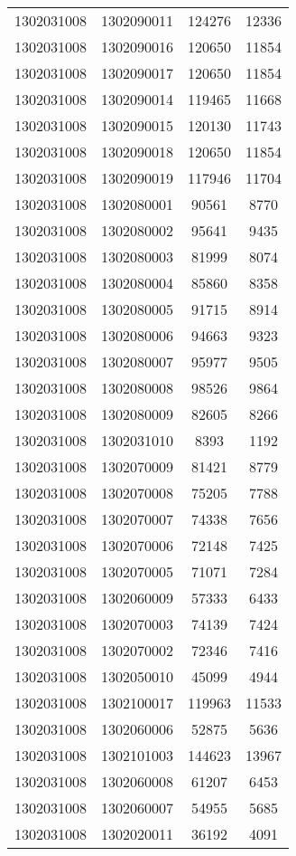 \begin{longtable}[h]{llcc}
		1302031008 & 1302090011 & 124276 & 12336\\
		1302031008 & 1302090016 & 120650 & 11854\\
		1302031008 & 1302090017 & 120650 & 11854\\
		1302031008 & 1302090014 & 119465 & 11668\\
		1302031008 & 1302090015 & 120130 & 11743\\
		1302031008 & 1302090018 & 120650 & 11854\\
		1302031008 & 1302090019 & 117946 & 11704\\
		1302031008 & 1302080001 & 90561 & 8770\\
		1302031008 & 1302080002 & 95641 & 9435\\
		1302031008 & 1302080003 & 81999 & 8074\\
		1302031008 & 1302080004 & 85860 & 8358\\
		1302031008 & 1302080005 & 91715 & 8914\\
		1302031008 & 1302080006 & 94663 & 9323\\
		1302031008 & 1302080007 & 95977 & 9505\\
		1302031008 & 1302080008 & 98526 & 9864\\
		1302031008 & 1302080009 & 82605 & 8266\\
		1302031008 & 1302031010 & 8393 & 1192\\
		1302031008 & 1302070009 & 81421 & 8779\\
		1302031008 & 1302070008 & 75205 & 7788\\
		1302031008 & 1302070007 & 74338 & 7656\\
		1302031008 & 1302070006 & 72148 & 7425\\
		1302031008 & 1302070005 & 71071 & 7284\\
		1302031008 & 1302060009 & 57333 & 6433\\
		1302031008 & 1302070003 & 74139 & 7424\\
		1302031008 & 1302070002 & 72346 & 7416\\
		1302031008 & 1302050010 & 45099 & 4944\\
		1302031008 & 1302100017 & 119963 & 11533\\
		1302031008 & 1302060006 & 52875 & 5636\\
		1302031008 & 1302101003 & 144623 & 13967\\
		1302031008 & 1302060008 & 61207 & 6453\\
		1302031008 & 1302060007 & 54955 & 5685\\
		1302031008 & 1302020011 & 36192 & 4091\\

\end{longtable}
